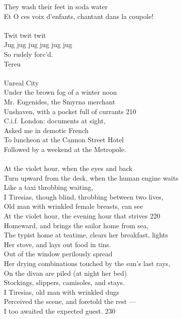 \documentclass{article}
\begin{document}
They wash their feet in soda water \\
Et O ces voix d'enfants, chantant dans la coupole! \\
 \\
Twit twit twit \\
Jug jug jug jug jug jug \\
So rudely forc'd. \\
Tereu \\
 \\
Unreal City \\
Under the brown fog of a winter noon \\
Mr. Eugenides, the Smyrna merchant \\
Unshaven, with a pocket full of currants                         \hfill 210 \\
C.i.f. London: documents at sight, \\
Asked me in demotic French \\
To luncheon at the Cannon Street Hotel \\
Followed by a weekend at the Metropole. \\
 \\
At the violet hour, when the eyes and back \\
Turn upward from the desk, when the human engine waits \\
Like a taxi throbbing waiting, \\
I Tiresias, though blind, throbbing between two lives, \\
Old man with wrinkled female breasts, can see \\
At the violet hour, the evening hour that strives                \hfill 220 \\
Homeward, and brings the sailor home from sea, \\
The typist home at teatime, clears her breakfast, lights \\
Her stove, and lays out food in tins. \\
Out of the window perilously spread \\
Her drying combinations touched by the sun's last rays, \\
On the divan are piled (at night her bed) \\
Stockings, slippers, camisoles, and stays. \\
I Tiresias, old man with wrinkled dugs \\
Perceived the scene, and foretold the rest --- \\
I too awaited the expected guest.                                \hfill 230 \\
\end{document}
